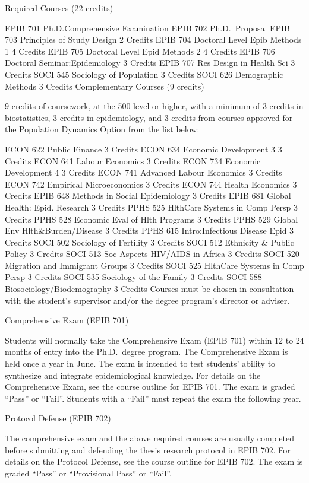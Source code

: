 \documentclass[
]{book}
\begin{document}
Required Courses (22 credits)

EPIB 701 Ph.D.Comprehensive Examination
EPIB 702 Ph.D.~Proposal
EPIB 703 Principles of Study Design 2 Credits
EPIB 704 Doctoral Level Epib Methods 1 4 Credits
EPIB 705 Doctoral Level Epid Methods 2 4 Credits
EPIB 706 Doctoral Seminar:Epidemiology 3 Credits
EPIB 707 Res Design in Health Sci 3 Credits
SOCI 545 Sociology of Population 3 Credits
SOCI 626 Demographic Methods 3 Credits
Complementary Courses (9 credits)

9 credits of coursework, at the 500 level or higher, with a minimum of 3 credits in biostatistics, 3 credits in epidemiology, and 3 credits from courses approved for the Population Dynamics Option from the list below:

ECON 622 Public Finance 3 Credits
ECON 634 Economic Development 3 3 Credits
ECON 641 Labour Economics 3 Credits
ECON 734 Economic Development 4 3 Credits
ECON 741 Advanced Labour Economics 3 Credits
ECON 742 Empirical Microeconomics 3 Credits
ECON 744 Health Economics 3 Credits
EPIB 648 Methods in Social Epidemiology 3 Credits
EPIB 681 Global Health: Epid. Research 3 Credits
PPHS 525 HlthCare Systems in Comp Persp 3 Credits
PPHS 528 Economic Eval of Hlth Programs 3 Credits
PPHS 529 Global Env Hlth\&Burden/Disease 3 Credits
PPHS 615 Intro:Infectious Disease Epid 3 Credits
SOCI 502 Sociology of Fertility 3 Credits
SOCI 512 Ethnicity \& Public Policy 3 Credits
SOCI 513 Soc Aspects HIV/AIDS in Africa 3 Credits
SOCI 520 Migration and Immigrant Groups 3 Credits
SOCI 525 HlthCare Systems in Comp Persp 3 Credits
SOCI 535 Sociology of the Family 3 Credits
SOCI 588 Biosociology/Biodemography 3 Credits
Courses must be chosen in consultation with the student's supervisor and/or the degree program's director or adviser.

Comprehensive Exam (EPIB 701)

Students will normally take the Comprehensive Exam (EPIB 701) within 12 to 24 months of entry into the Ph.D.~degree program. The Comprehensive Exam is held once a year in June. The exam is intended to test students' ability to synthesize and integrate epidemiological knowledge. For details on the Comprehensive Exam, see the course outline for EPIB 701. The exam is graded ``Pass'' or ``Fail''. Students with a ``Fail'' must repeat the exam the following year.

Protocol Defense (EPIB 702)

The comprehensive exam and the above required courses are usually completed before submitting and defending the thesis research protocol in EPIB 702. For details on the Protocol Defense, see the course outline for EPIB 702. The exam is graded ``Pass'' or ``Provisional Pass'' or ``Fail''.
\end{document}
